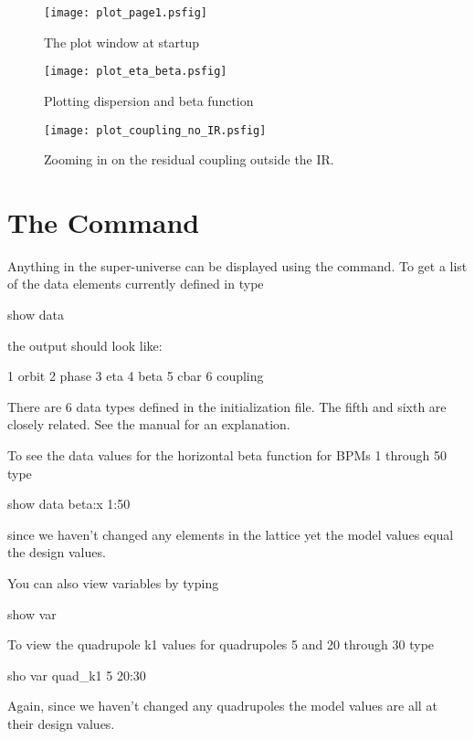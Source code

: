 \documentclass{report}
\begin{document}
\begin{figure}
  \centering
  \texttt{[image: plot\_page1.psfig]}
  \caption{The plot window at startup}
  \label{f:plot_begin}
\end{figure}

\begin{figure}
  \centering
  \texttt{[image: plot\_eta\_beta.psfig]}
  \caption{Plotting dispersion and beta function}
  \label{f:plot_eta_beta}
\end{figure}

\begin{figure}
  \centering
  \texttt{[image: plot\_coupling\_no\_IR.psfig]}
  \caption{Zooming in on the residual coupling outside the IR.}
  \label{f:plot_coupling_no_IR}
\end{figure}

\section{The  Command}

Anything in the super-universe can be displayed using the  command. To
get a list of the data elements currently defined in \tao type
\begin{example}
  show data
\end{example}
the output should look like:
\begin{example}
   1  orbit
   2  phase
   3  eta
   4  beta
   5  cbar
   6  coupling
\end{example}
There are 6 data types defined in the initialization file. The fifth and sixth are 
closely related. See the manual for an explanation.

To see the data values for the horizontal beta function for \cesr BPMs 1 through
50 type
\begin{example}
  show data beta:x 1:50
\end{example}
since we haven't changed any elements in the lattice yet the model values equal
the design values.

You can also view variables by typing
\begin{example}
  show var
\end{example}
To view the quadrupole k1 values for \cesr quadrupoles 5  and 20 through 30 type
\begin{example}
  sho var quad\_k1 5 20:30
\end{example}
Again, since we haven't changed any quadrupoles the model values are all at their
design values.
\end{document}
